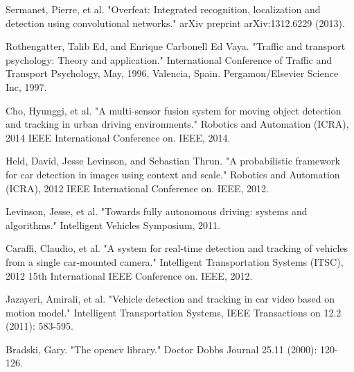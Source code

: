 \documentclass[journal]{IEEEtran}
\begin{document}

%
%
%
\begin{thebibliography}{1}

Sermanet, Pierre, et al. "Overfeat: Integrated recognition, localization and detection using convolutional networks." arXiv preprint arXiv:1312.6229 (2013).

Rothengatter, Talib Ed, and Enrique Carbonell Ed Vaya. "Traffic and transport psychology: Theory and application." International Conference of Traffic and Transport Psychology, May, 1996, Valencia, Spain. Pergamon/Elsevier Science Inc, 1997.

Cho, Hyunggi, et al. "A multi-sensor fusion system for moving object detection and tracking in urban driving environments." Robotics and Automation (ICRA), 2014 IEEE International Conference on. IEEE, 2014.

Held, David, Jesse Levinson, and Sebastian Thrun. "A probabilistic framework for car detection in images using context and scale." Robotics and Automation (ICRA), 2012 IEEE International Conference on. IEEE, 2012.

Levinson, Jesse, et al. "Towards fully autonomous driving: systems and algorithms." Intelligent Vehicles Symposium, 2011.


Caraffi, Claudio, et al. "A system for real-time detection and tracking of vehicles from a single car-mounted camera." Intelligent Transportation Systems (ITSC), 2012 15th International IEEE Conference on. IEEE, 2012.

Jazayeri, Amirali, et al. "Vehicle detection and tracking in car video based on motion model." Intelligent Transportation Systems, IEEE Transactions on 12.2 (2011): 583-595.

Bradski, Gary. "The opencv library." Doctor Dobbs Journal 25.11 (2000): 120-126.


\end{thebibliography}
\end{document}
